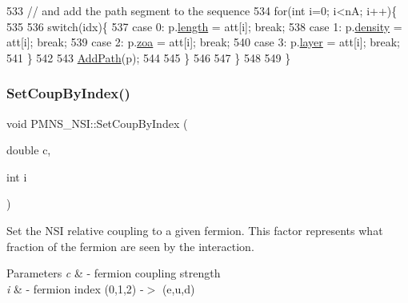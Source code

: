 \begin{DoxyCode}
533     \textcolor{comment}{// and add the path segment to the sequence}
534     \textcolor{keywordflow}{for}(\textcolor{keywordtype}{int} i=0; i<nA; i++)\{
535 
536       \textcolor{keywordflow}{switch}(idx)\{
537         \textcolor{keywordflow}{case} 0: p.\hyperlink{structOscProb_1_1NuPath_af22660894b6e25cf835500381b155557}{length}  = att[i]; \textcolor{keywordflow}{break};
538         \textcolor{keywordflow}{case} 1: p.\hyperlink{structOscProb_1_1NuPath_a54ddd451db69bc54434de3cf18a117ca}{density} = att[i]; \textcolor{keywordflow}{break};
539         \textcolor{keywordflow}{case} 2: p.\hyperlink{structOscProb_1_1NuPath_af3213f3691ba83c6bc05f4a3490f6b31}{zoa}     = att[i]; \textcolor{keywordflow}{break};
540         \textcolor{keywordflow}{case} 3: p.\hyperlink{structOscProb_1_1NuPath_a442b160899e554ad1d800989510d5309}{layer}   = att[i]; \textcolor{keywordflow}{break};
541       \}
542 
543       \hyperlink{classOscProb_1_1PMNS__Base_a887dc9d4dc569ec0cdef3933b4c60efc}{AddPath}(p);
544 
545     \}
546 
547   \}
548 
549 \}
\end{DoxyCode}
\mbox{\label{classOscProb_1_1PMNS__NSI_a276d475bbebcdf24502a5555ee65b136}} 
\subsubsection{\texorpdfstring{Set\+Coup\+By\+Index()}{SetCoupByIndex()}}
{\footnotesize\ttfamily void P\+M\+N\+S\+\_\+\+N\+S\+I\+::\+Set\+Coup\+By\+Index (\begin{DoxyParamCaption}\item[{double}]{c,  }\item[{int}]{i }\end{DoxyParamCaption})\hspace{0.3cm}{\ttfamily [virtual]}}

Set the N\+SI relative coupling to a given fermion. This factor represents what fraction of the fermion are seen by the interaction.


\begin{DoxyParams}{Parameters}
{\em c} & -\/ fermion coupling strength \\
\hline
{\em i} & -\/ fermion index (0,1,2) -\/$>$ (e,u,d) \\
\hline
\end{DoxyParams}


